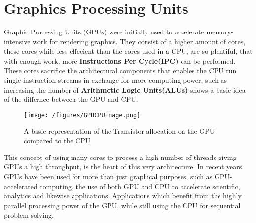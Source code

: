 \section{Graphics Processing Units}
Graphic Processing Units (GPUs) were initially used to accelerate memory-intensive work for rendering graphics.
They consist of a higher amount of cores, these cores while less effecient than the cores used in a CPU, are so plentiful, that with enough work, more \textbf{Instructions Per Cycle(IPC)} can be performed.
These cores sacrifice the architectural components that enables the CPU run single instruction streams in exchange for more computing power, such as increasing the number of \textbf{Arithmetic Logic Units(ALUs)}  shows a basic idea of the differnce between the GPU and CPU. %
\begin{figure}[h!]
\centering
 \texttt{[image: /figures/GPUCPUimage.png]} %
\caption{A basic representation of the Transistor allocation on the GPU compared to the CPU}\label{image:GPUCPUimage} %
\end{figure}

This concept of using many cores to process a high number of threads giving GPUs a high throughput, is the heart of this very architecture.
In recent years GPUs have been used for more than just graphical purposes, such as GPU-accelerated computing, the use of both GPU and CPU to accelerate scientific, analytics and likewise applications.
Applications which benefit from the highly parallel processing power of the GPU, while still using the CPU for sequential problem solving.


